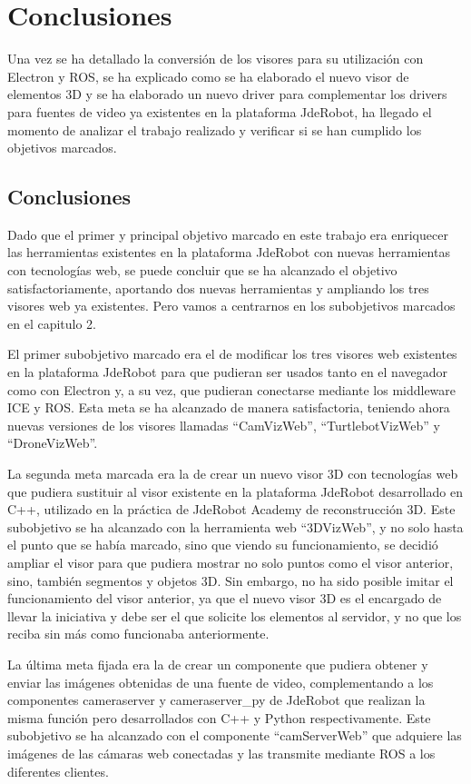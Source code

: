 \chapter{Conclusiones}\label{cap.conclusiones}

Una vez se ha detallado la conversión de los visores para su utilización con Electron y ROS, se ha explicado como se ha elaborado el nuevo visor de elementos 3D y se ha elaborado un nuevo driver para complementar los drivers para fuentes de video ya existentes en la plataforma JdeRobot, ha llegado el momento de analizar el trabajo realizado y verificar si se han cumplido los objetivos marcados.

\section{Conclusiones}
Dado que el primer y principal objetivo marcado en este trabajo era enriquecer las herramientas existentes en la plataforma JdeRobot con nuevas herramientas con tecnologías web, se puede concluir que se ha alcanzado el objetivo satisfactoriamente, aportando dos nuevas herramientas y ampliando los tres visores web ya existentes. Pero vamos a centrarnos en los subobjetivos marcados en el capitulo 2.

El primer subobjetivo marcado era el de modificar los tres visores web existentes en la plataforma JdeRobot para que pudieran ser usados tanto en el navegador como con Electron y, a su vez, que pudieran conectarse mediante los middleware ICE y ROS. Esta meta se ha alcanzado de manera satisfactoria, teniendo ahora nuevas versiones de los visores llamadas ``CamVizWeb'', ``TurtlebotVizWeb'' y ``DroneVizWeb''. 

La segunda meta marcada era la de crear un nuevo visor 3D con tecnologías web que pudiera sustituir al visor existente en la plataforma JdeRobot desarrollado en C++, utilizado en la práctica de JdeRobot Academy de reconstrucción 3D. Este subobjetivo se ha alcanzado con la herramienta web ``3DVizWeb'', y no solo hasta el punto que se había marcado, sino que viendo su funcionamiento, se decidió ampliar el visor para que pudiera mostrar no solo puntos como el visor anterior, sino, también segmentos y objetos 3D. Sin embargo, no ha sido posible imitar el funcionamiento del visor anterior, ya que el nuevo visor 3D es el encargado de llevar la iniciativa y debe ser el que solicite los elementos al servidor, y no que los reciba sin más como funcionaba anteriormente.

La última meta fijada era la de crear un componente que pudiera obtener y enviar las imágenes obtenidas de una fuente de video, complementando a los componentes cameraserver y cameraserver\_py de JdeRobot que realizan la misma función pero desarrollados con C++ y Python respectivamente. Este subobjetivo se ha alcanzado con el componente ``camServerWeb'' que adquiere las imágenes de las cámaras web conectadas y las transmite mediante ROS a los diferentes clientes.

